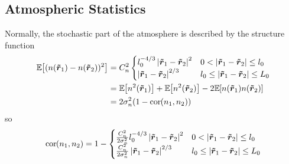 \subsection{Atmospheric Statistics}
 Normally, the stochastic part of the atmosphere is described by the structure function~\cite{andrews2005laser}
\begin{equation}
\begin{split}
  \Expect{(n(\vect{\dim{r}}_1) - n(\vect{\dim{r}}_2))^2} &= 
  C_n^2  \begin{cases}
        l_{0}^{-4/3} \left|\vect{\dim{r}}_1-\vect{\dim{r}}_2\right|^{2} & 0 < \left|\vect{\dim{r}}_1-\vect{\dim{r}}_2\right| \leq l_{0} \\
       \left|\vect{\dim{r}}_1 - \vect{\dim{r}}_2 \right|^{2/3} &  l_{0}  \leq \left|\vect{\dim{r}}_1 - \vect{\dim{r}}_2\right| \leq  L_{0}  \\
   \end{cases}\\
   &= \Expect{n^2(\vect{\dim{r}}_1)} +  \Expect{n^2(\vect{\dim{r}}_2)} 
   - 2\Expect{n(\vect{\dim{r}}_1)n(\vect{\dim{r}}_2)} \\
   &= 2\sigma_n^2(1-\cor{n_1,n_2})
\end{split}
\end{equation}
so
\begin{equation}
  \cor{n_1,n_2} = 1 - 
    \begin{cases}
        \frac{C_n^2}{2\sigma_n^2}l_{0}^{-4/3} \left|\vect{\dim{r}}_1-\vect{\dim{r}}_{2}\right|^{2} & 0 < \left|\vect{\dim{r}}_1-\vect{\dim{r}}_{2}\right| \leq l_{0} \\
        \frac{C_n^2}{2\sigma_n^2} \left|\vect{\dim{r}}_1-\vect{\dim{r}}_{2}\right|^{2/3} &  l_{0}  \leq \left|\vect{\dim{r}}_1-\vect{\dim{r}}_{2}\right| \leq  L_{0}  \\
   \end{cases}
\end{equation}

